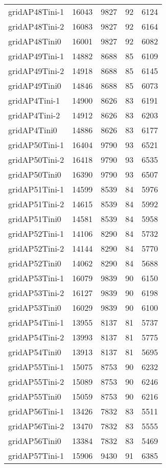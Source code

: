 \begin{longtable}{lrrrr}
gridAP48Tini-1 & 16043 & 9827 & 92 & 6124 \\
gridAP48Tini-2 & 16083 & 9827 & 92 & 6164 \\
gridAP48Tini0 & 16001 & 9827 & 92 & 6082 \\
gridAP49Tini-1 & 14882 & 8688 & 85 & 6109 \\
gridAP49Tini-2 & 14918 & 8688 & 85 & 6145 \\
gridAP49Tini0 & 14846 & 8688 & 85 & 6073 \\
gridAP4Tini-1 & 14900 & 8626 & 83 & 6191 \\
gridAP4Tini-2 & 14912 & 8626 & 83 & 6203 \\
gridAP4Tini0 & 14886 & 8626 & 83 & 6177 \\
gridAP50Tini-1 & 16404 & 9790 & 93 & 6521 \\
gridAP50Tini-2 & 16418 & 9790 & 93 & 6535 \\
gridAP50Tini0 & 16390 & 9790 & 93 & 6507 \\
gridAP51Tini-1 & 14599 & 8539 & 84 & 5976 \\
gridAP51Tini-2 & 14615 & 8539 & 84 & 5992 \\
gridAP51Tini0 & 14581 & 8539 & 84 & 5958 \\
gridAP52Tini-1 & 14106 & 8290 & 84 & 5732 \\
gridAP52Tini-2 & 14144 & 8290 & 84 & 5770 \\
gridAP52Tini0 & 14062 & 8290 & 84 & 5688 \\
gridAP53Tini-1 & 16079 & 9839 & 90 & 6150 \\
gridAP53Tini-2 & 16127 & 9839 & 90 & 6198 \\
gridAP53Tini0 & 16029 & 9839 & 90 & 6100 \\
gridAP54Tini-1 & 13955 & 8137 & 81 & 5737 \\
gridAP54Tini-2 & 13993 & 8137 & 81 & 5775 \\
gridAP54Tini0 & 13913 & 8137 & 81 & 5695 \\
gridAP55Tini-1 & 15075 & 8753 & 90 & 6232 \\
gridAP55Tini-2 & 15089 & 8753 & 90 & 6246 \\
gridAP55Tini0 & 15059 & 8753 & 90 & 6216 \\
gridAP56Tini-1 & 13426 & 7832 & 83 & 5511 \\
gridAP56Tini-2 & 13470 & 7832 & 83 & 5555 \\
gridAP56Tini0 & 13384 & 7832 & 83 & 5469 \\
gridAP57Tini-1 & 15906 & 9430 & 91 & 6385 \\

\end{longtable}
